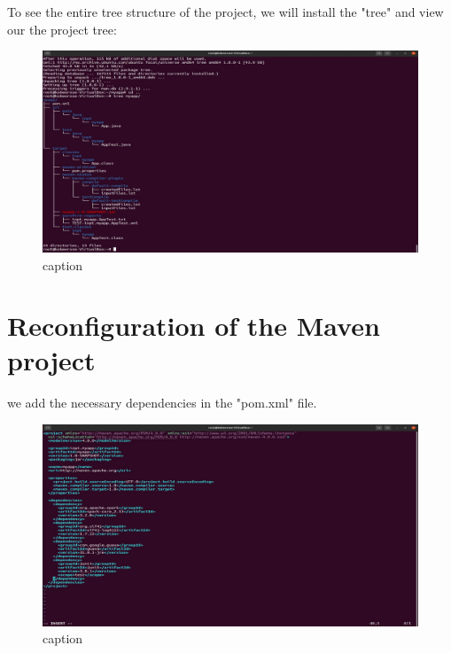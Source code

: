 \begin{spacing}{1.2}
\par To see the entire tree structure of the project, we will install the "tree" and view our the project tree:
\\
\begin{figure}[!htb] 
\begin{center} 
\includegraphics[width=1\linewidth]{Big_Data/Spark/Running a Spark Batch app in Java/App tree.jpg} 
\end{center} 
\caption{caption} 
\end{figure} 
\FloatBarrier

\section{Reconfiguration of the Maven project}

\par we add the necessary dependencies in the "pom.xml" file.
\\
\begin{figure}[!htb] 
\begin{center} 
\includegraphics[width=1\linewidth]{Big_Data/Spark/Running a Spark Batch app in Java/pom.xml config.jpg} 
\end{center} 
\caption{caption} 
\end{figure} 
\FloatBarrier




\end{spacing}
